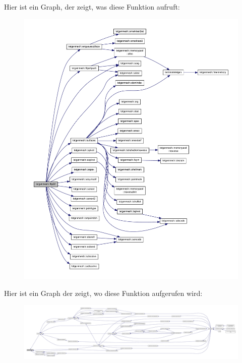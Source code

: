 Hier ist ein Graph, der zeigt, was diese Funktion aufruft\-:
\nopagebreak
\begin{figure}[H]
\begin{center}
\leavevmode
\includegraphics[width=350pt]{classtetgenmesh_ac34f0cd148accd132b491f9c6145c6f6_cgraph}
\end{center}
\end{figure}




Hier ist ein Graph der zeigt, wo diese Funktion aufgerufen wird\-:
\nopagebreak
\begin{figure}[H]
\begin{center}
\leavevmode
\includegraphics[width=350pt]{classtetgenmesh_ac34f0cd148accd132b491f9c6145c6f6_icgraph}
\end{center}
\end{figure}


